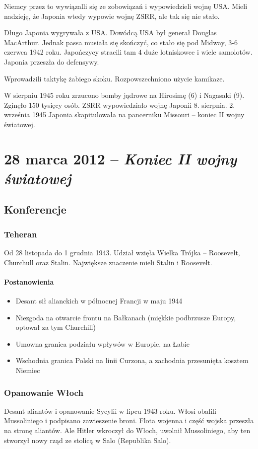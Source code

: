 \documentclass [a4paper, 11pt, oneside]{book}
\begin{document}
Niemcy przez to wywiązalli się ze zobowiązań i wypowiedzieli wojnę USA. Mieli nadzieję, że Japonia wtedy wypowie wojnę ZSRR, ale tak się nie stało.

Długo Japonia wygrywała z USA. Dowódcą USA był generał Douglas MacArthur. Jednak passa musiała się skończyć, co stało się pod Midway, 3-6 czerwca 1942 roku. Japończycy stracili tam 4 duże lotniskowce i wiele samolotów. Japonia przeszła do defensywy.

Wprowadzili taktykę żabiego skoku. Rozpowszechniono użycie kamikaze.

W sierpniu 1945 roku zrzucono bomby jądrowe na Hirosimę (6) i Nagasaki (9). Zginęło 150 tysięcy osób. ZSRR wypowiedziało wojnę Japonii 8. sierpnia. 2. września 1945 Japonia skapitulowała na pancerniku Missouri -- koniec II wojny światowej.

\chapter{28 marca 2012 -- \textit{Koniec II wojny światowej}}

\section{Konferencje}

\subsection{Teheran}
Od 28 listopada do 1 grudnia 1943. Udział wzięła Wielka Trójka -- Roosevelt, Churchull oraz Stalin. Największe znaczenie mieli Stalin i Roosevelt. 
\subsubsection{Postanowienia}
\begin{itemize}
\item Desant sił alianckich w północnej Francji w maju 1944
\item Niezgoda na otwarcie frontu na Bałkanach (miękkie podbrzusze Europy, optował za tym Churchill)
\item Umowna granica podziału wpływów w Europie, na Łabie
\item Wschodnia granica Polski na linii Curzona, a zachodnia przesunięta kosztem Niemiec
\end{itemize}

\subsection{Opanowanie Włoch}

Desant aliantów i opanowanie Sycylii w lipcu 1943 roku. Włosi obalili Mussoliniego i podpisano zawieszenie broni. Flota wojenna i część wojska przeszła na stronę aliantów. Ale Hitler wkroczył do Włoch, uwolnił Mussoliniego, aby ten stworzył nowy rząd ze stolicą w Salo (Republika Salo).
\end{document}
